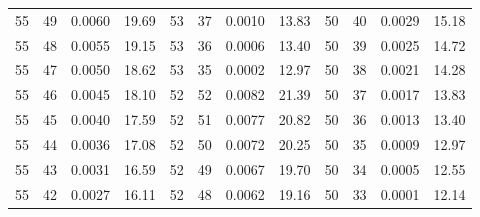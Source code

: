 \begin{tabular}{llll|llll|llll}
55 & 49 & 0.0060 & 19.69 & 53 & 37 & 0.0010 & 13.83 & 50 & 40 & 0.0029 & 15.18\\
55 & 48 & 0.0055 & 19.15 & 53 & 36 & 0.0006 & 13.40 & 50 & 39 & 0.0025 & 14.72\\
55 & 47 & 0.0050 & 18.62 & 53 & 35 & 0.0002 & 12.97 & 50 & 38 & 0.0021 & 14.28\\
55 & 46 & 0.0045 & 18.10 & 52 & 52 & 0.0082 & 21.39 & 50 & 37 & 0.0017 & 13.83\\
55 & 45 & 0.0040 & 17.59 & 52 & 51 & 0.0077 & 20.82 & 50 & 36 & 0.0013 & 13.40\\
55 & 44 & 0.0036 & 17.08 & 52 & 50 & 0.0072 & 20.25 & 50 & 35 & 0.0009 & 12.97\\
55 & 43 & 0.0031 & 16.59 & 52 & 49 & 0.0067 & 19.70 & 50 & 34 & 0.0005 & 12.55\\
55 & 42 & 0.0027 & 16.11 & 52 & 48 & 0.0062 & 19.16 & 50 & 33 & 0.0001 & 12.14\\
\bottomrule
\end{tabular}
\newpage

